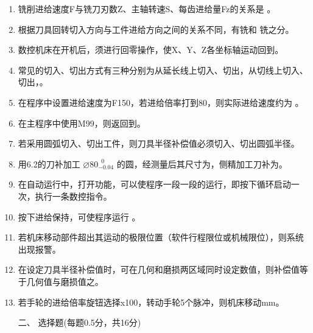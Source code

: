 \documentclass[12pt,twocolumn,landscape,UTF8,twoside]{ctexart}
\begin{document}
\begin{spacing}{1.3}
\begin{enumerate} [1、]
		\item 铣削进给速度F与铣刀刃数Z、主轴转速S、每齿进给量Fz的关系是			。
		
		\item 根据刀具回转切入方向与工件进给方向之间的关系不同，有铣和		铣之分。
		
		\item 数控机床在开机后，须进行回零操作，使X、Y、Z各坐标轴运动回到。
		
		\item 常见的切入、切出方式有三种分别为从延长线上切入、切出，从切线上切入、切出，。
		
		\item 在程序中设置进给速度为F150，若进给倍率打到80，则实际进给速度约为	。
		
		\item 在主程序中使用M99，则返回到。

		\item 若采用圆弧切入、切出工件，则刀具半径补偿值必须切入、切出圆弧半径。

		\item 用6.2的刀补加工 $\diameter 80^{~\;0}_{-0.04}$ 的圆，经测量后其尺寸为，侧精加工刀补为。

		\item 在自动运行中，打开功能，可以使程序一段一段的运行，即按下循环启动一次，执行一条数控指令。

		\item 按下进给保持，可使程序运行		。

		\item 若机床移动部件超出其运动的极限位置（软件行程限位或机械限位），则系统出现报警。

		\item 在设定刀具半径补偿值时，可在几何和磨损两区域同时设定数值，则补偿值等于几何值与磨损值之。

		\item 若手轮的进给倍率旋钮选择x100，转动手轮5个脉冲，则机床移动mm。
		

\item[\heiti 二、] {\heiti 选择题(每题0.5分，共16分)}	
		

\end{enumerate}
\end{spacing}
\end{document}
